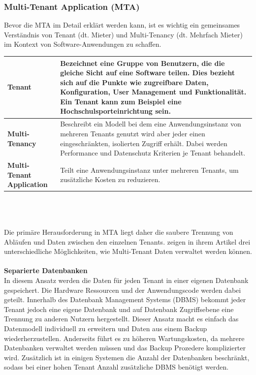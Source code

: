 \subsubsection{Multi-Tenant Application (MTA)}
Bevor die MTA im Detail erklärt werden kann, ist es wichtig ein gemeinsames Verständnis von Tenant (dt. Mieter) und Multi-Tenancy (dt. Mehrfach Mieter) im Kontext von Software-Anwendungen zu schaffen. 
\\
\begin{tabular}{|p{4.5cm}|p{12cm}|}
	\hline 
	\textbf{Tenant} & Bezeichnet eine Gruppe von Benutzern, die die gleiche Sicht auf eine Software teilen. Dies bezieht sich auf die Punkte wie zugreifbare Daten, Konfiguration, User Management und Funktionalität. Ein Tenant kann zum Beispiel eine Hochschulsporteinrichtung sein. \\ 
	\hline 
	\textbf{Multi-Tenancy} & Beschreibt ein Modell bei dem eine Anwendungsinstanz von mehreren Tenants genutzt wird aber jeder einen eingeschränkten, isolierten Zugriff erhält. Dabei werden Performance und Datenschutz Kriterien je Tenant behandelt. \\ 
	\hline 
	\textbf{Multi-Tenant Application} & Teilt eine Anwendungsinstanz unter mehreren Tenants, um zusätzliche Kosten zu reduzieren. \\ 
	\hline 
\end{tabular}
\\
\cite*[vgl. ][S.2]{Krebs.2012}
\\
\\
Die primäre Herausforderung in MTA liegt daher die saubere Trennung von Abläufen und Daten zwischen den einzelnen Tenants. \citeauthor{Chong.2006} zeigen in ihrem Artikel drei unterschiedliche Möglichkeiten, wie Multi-Tenant Daten verwaltet werden können.
\\
\\
\textbf{Separierte Datenbanken}\\
In diesem Ansatz werden die Daten für jeden Tenant in einer eigenen Datenbank gespeichert. Die Hardware Ressourcen und der Anwendungscode werden dabei geteilt. Innerhalb des Datenbank Management Systems (DBMS) bekommt jeder Tenant jedoch eine eigene Datenbank und auf Datenbank Zugriffsebene eine Trennung zu anderen Nutzern hergestellt. Dieser Ansatz macht es einfach das Datenmodell individuell zu erweitern und Daten aus einem Backup wiederherzustellen. Anderseits führt es zu höheren Wartungskosten, da mehrere Datenbanken verwaltet werden müssen und das Backup Prozedere komplizierter wird. Zusätzlich ist in einigen Systemen die Anzahl der Datenbanken beschränkt, sodass bei einer hohen Tenant Anzahl zusätzliche DBMS benötigt werden.


